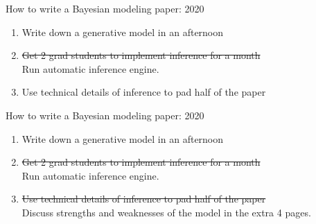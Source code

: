 \begin{frame}{How to write a Bayesian modeling paper: 2020}
  \begin{block}{}
    \begin{enumerate}
      \item Write down a generative model in an afternoon
      \vspace{\baselineskip}
      \vspace{\baselineskip}
      \item \sout{Get 2 grad students to implement inference for a month} 
      \\ Run automatic inference engine.
      \vspace{\baselineskip}
      \vspace{\baselineskip}
      \item Use technical details of inference to pad half of the paper
    \end{enumerate}
  \end{block}
\end{frame}

\begin{frame}{How to write a Bayesian modeling paper: 2020}
  \begin{block}{}
    \begin{enumerate}
      \item Write down a generative model in an afternoon
      \vspace{\baselineskip}
      \vspace{\baselineskip}
      \item \sout{Get 2 grad students to implement inference for a month} 
      \\Run automatic inference engine.
      \vspace{\baselineskip}
      \vspace{\baselineskip}
      \item \sout{Use technical details of inference to pad half of the paper}
      \\ Discuss strengths and weaknesses of the model in the extra 4 pages.
    \end{enumerate}
  \end{block}
\end{frame}





